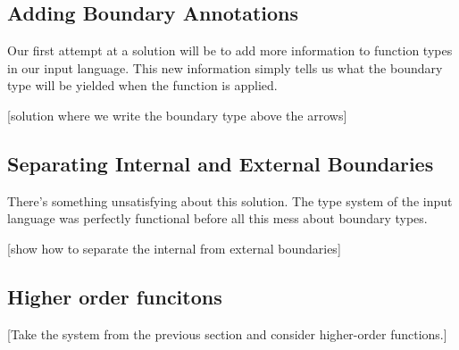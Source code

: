 \documentclass[]{article}
\begin{document}
\begin{abstrsyn}
\subsection{Adding Boundary Annotations}

Our first attempt at a solution will be to add more information to function types in our input language.
This new information simply tells us what the boundary type will be yielded when the function is applied.

[solution where we write the boundary type above the arrows]

\subsection{Separating Internal and External Boundaries}

There's something unsatisfying about this solution. 
The type system of the input language was perfectly functional before all this mess about boundary types.

[show how to separate the internal from external boundaries]

\subsection{Higher order funcitons}

[Take the system from the previous section and consider higher-order functions.]





\end{abstrsyn}
\end{document}
